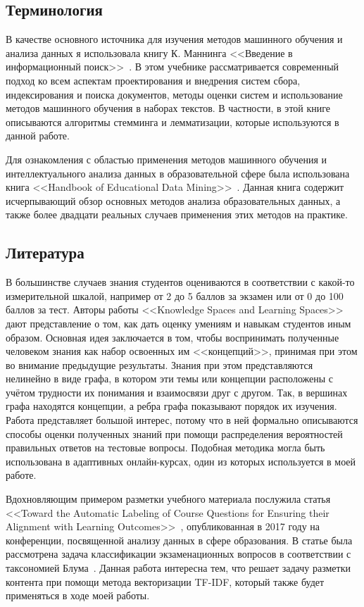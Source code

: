 \documentclass[14pt]{matmex-diploma-custom}
\begin{document}
\subsection{Терминология}
В качестве основного источника для изучения методов машинного обучения и анализа данных я использовала книгу К. Маннинга <<Введение в информационный поиск>>~\cite{manning}. В этом учебнике рассматривается современный подход ко всем аспектам проектирования и внедрения систем сбора, индексирования и поиска документов, методы оценки систем и использование методов машинного обучения в наборах текстов. В частности, в этой книге описываются алгоритмы стемминга и лемматизации, которые используются в данной работе.

Для ознакомления с областью применения методов машинного обучения и интеллектуального анализа данных в образовательной сфере была использована книга <<Handbook of Educational Data Mining>>~\cite{handbook}. Данная книга содержит исчерпывающий обзор основных методов анализа образовательных данных, а также более двадцати реальных случаев применения этих методов на практике.
\subsection{Литература}
В большинстве случаев знания студентов оцениваются в соответствии с какой-то измерительной шкалой, например от 2 до 5 баллов за экзамен или от 0 до 100 баллов за тест. Авторы работы <<Knowledge Spaces and Learning Spaces>>~\cite{knowspaces} дают представление о том, как дать оценку умениям и навыкам студентов иным образом. Основная идея заключается в том, чтобы воспринимать полученные человеком знания как набор освоенных им <<концепций>>, принимая при этом во внимание предыдущие результаты. Знания при этом представляются нелинейно в виде графа, в котором эти темы или концепции расположены с учётом трудности их понимания и взаимосвязи друг с другом. Так, в вершинах графа находятся концепции, а ребра графа показывают порядок их изучения. Работа представляет большой интерес, потому что в ней формально описываются способы оценки полученных знаний при помощи распределения вероятностей правильных ответов на тестовые вопросы. Подобная методика могла быть использована в адаптивных онлайн-курсах, один из которых используется в моей работе.

Вдохновляющим примером разметки учебного материала послужила статья <<Toward the Automatic Labeling of Course Questions for
Ensuring their Alignment with Learning Outcomes>>~\cite{paper44}, опубликованная в 2017 году на конференции, посвященной анализу данных в сфере образования. В статье была рассмотрена задача классификации экзаменационных вопросов в соответствии с таксономией Блума~\cite{bloom}. Данная работа интересна тем, что решает задачу разметки контента при помощи метода векторизации TF-IDF, который также будет применяться в ходе моей работы.
\end{document}
